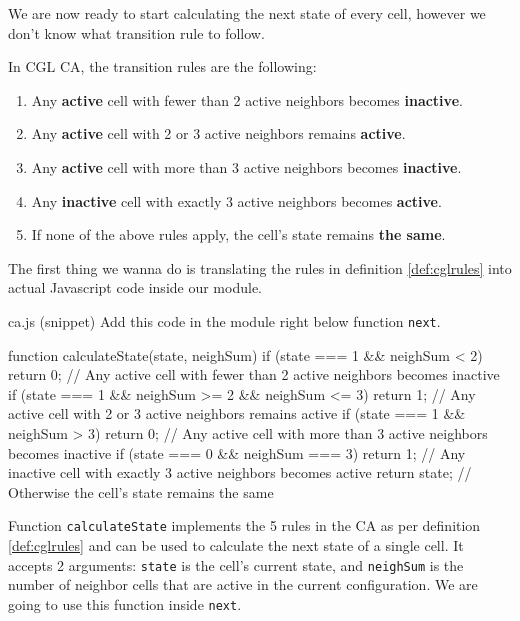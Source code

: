 We are now ready to start calculating the next state of every cell, however we don't know what
transition rule to follow.

\begin{definition}
\label{def:cglrules}
In CGL CA, the transition rules are the following:
\begin{enumerate}
\item Any \textbf{active} cell with fewer than 2 active neighbors becomes \textbf{inactive}.
\item Any \textbf{active} cell with 2 or 3 active neighbors remains \textbf{active}.
\item Any \textbf{active} cell with more than 3 active neighbors becomes \textbf{inactive}.
\item Any \textbf{inactive} cell with exactly 3 active neighbors becomes \textbf{active}.
\item If none of the above rules apply, the cell's state remains \textbf{the same}.
\end{enumerate}
\end{definition}

The first thing we wanna do is translating the rules in definition \ref{def:cglrules} into
actual Javascript code inside our module.

\begin{programcode}{ca.js (snippet)}
Add this code in the module right below function \texttt{next}.
\begin{code}
function calculateState(state, neighSum) {
  if (state === 1 && neighSum < 2) {
    return 0; // Any active cell with fewer than 2 active neighbors becomes inactive
  }
  if (state === 1 && neighSum >= 2 && neighSum <= 3) {
    return 1; // Any active cell with 2 or 3 active neighbors remains active
  }
  if (state === 1 && neighSum > 3) {
    return 0; // Any active cell with more than 3 active neighbors becomes inactive
  }
  if (state === 0 && neighSum === 3) {
    return 1; // Any inactive cell with exactly 3 active neighbors becomes active
  }
  return state; // Otherwise the cell's state remains the same
}
\end{code}
\end{programcode}

Function \texttt{calculateState} implements the 5 rules in the CA as per definition \ref{def:cglrules} and
can be used to calculate the next state of a single cell.
It accepts 2 arguments: \texttt{state} is the cell's current state, and \texttt{neighSum} is the number of
neighbor cells that are active in the current configuration. We are going to use this function
inside \texttt{next}.

